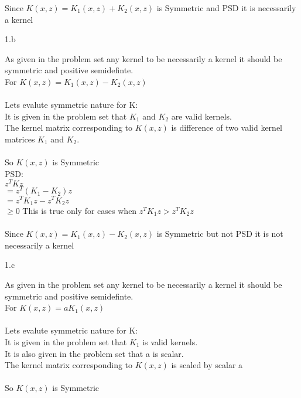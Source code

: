 Since  $K(x,z) = K_1(x,z) + K_2(x,z) $ is Symmetric and PSD it is necessarily a kernel
  
\clearpage

\LARGE
1.b
\normalsize

  As given in the problem set any kernel to be necessarily a kernel it should be symmetric and positive semidefinte.\\ 
  For $K(x,z) = K_1(x,z) - K_2(x,z) $ \\ \\
  Lets evalute symmetric nature for K: \\
  It is given in the problem set that $K_1$ and $K_2$ are valid kernels. \\
  The kernel matrix corresponding to $K(x,z) $ is difference of two valid kernel matrices $K_1$ and $K_2$. \\ \\ 
  So $K(x,z)$ is Symmetric\\
  
  PSD: \\
  $z^TKz$ \\
  $ = z^T(K_1-K_2)z$ \\
  $ = z^TK_1z - z^TK_2z$ \\
  $\geq 0$  This is true only for cases when $ z^TK_1z > z^TK_2z$ \\ \\
  
 Since  $K(x,z) = K_1(x,z) - K_2(x,z) $ is Symmetric but not PSD it is not necessarily a kernel


\clearpage

\LARGE
1.c
\normalsize

  As given in the problem set any kernel to be necessarily a kernel it should be symmetric and positive semidefinte.\\ 
  For $K(x,z) = aK_1(x,z) $ \\ \\
  Lets evalute symmetric nature for K: \\
  It is given in the problem set that $K_1$ is valid kernels. \\
  It is also given in the problem set that a is scalar. \\
  The kernel matrix corresponding to $K(x,z) $ is scaled by scalar a \\ \\ 
  So $K(x,z)$ is Symmetric\\
  

